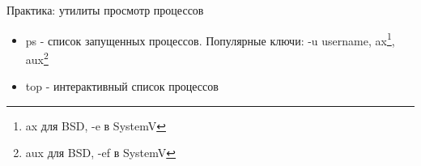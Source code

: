 \begin{frame}[fragile]{Практика: утилиты просмотр процессов}
    
  \begin{itemize}
      \item \alert{ps} - список запущенных процессов.\newline
	Популярные ключи: \alert{-u username}, 
	\alert{ax}\footnote{ \alert{ax} для BSD, \alert{-e} в SystemV}, 
	\alert{aux}\footnote{ \alert{aux} для BSD, \alert{-ef} в SystemV}

      \item \alert{top} - интерактивный список процессов

    \end{itemize}

\end{frame}
